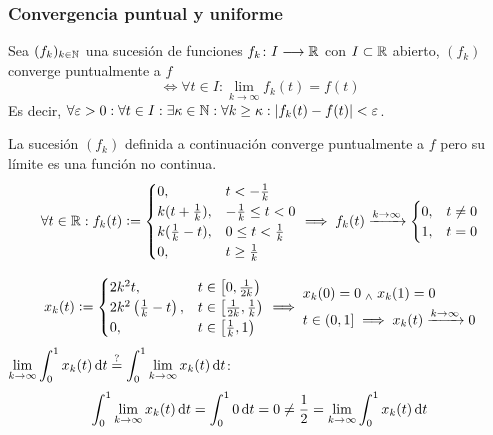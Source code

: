 \subsubsection{Convergencia puntual y uniforme}
\begin{defn}
	Sea $(f_k)_{k\in\mathbb{N}}$ una sucesión de funciones $f_k \colon I \longrightarrow \mathbb{R}$ con $I\subset \mathbb{R}$ abierto, $(f_k)$ converge puntualmente a $f$
	\[\iff \forall t\in I : \lim_{k\to\infty} f_k(t) = f(t)\]
	Es decir, $\forall \varepsilon > 0 : \forall t\in I : \exists \kappa \in \mathbb{N} : \forall k\geq \kappa : \left|f_k(t) - f(t)\right| < \varepsilon$.
\end{defn}

\begin{ejem}
	La sucesión $(f_k)$ definida a continuación converge puntualmente a $f$ pero su límite es una función no continua.
	\[\forall t \in\mathbb{R} : f_k(t) \vcentcolon= \begin{cases}
			0,                & t < -\frac{1}{k}        \\
			k(t+\frac{1}{k}), & -\frac{1}{k} \leq t < 0 \\
			k(\frac{1}{k}-t), & 0\leq t < \frac{1}{k}   \\
			0,                & t\geq \frac{1}{k}
		\end{cases} \implies f_k(t)\xrightarrow{k\to\infty}\begin{cases}
			0, & t\ne 0 \\
			1, & t=0
		\end{cases}\]
\end{ejem}
\begin{ejem}
	\[x_k(t) \vcentcolon= \begin{cases}
			2k^2t,                          & t\in\left[0, \frac{1}{2k}\right)           \\
			2k^2\left(\frac{1}{k}-t\right), & t\in\left[\frac{1}{2k}, \frac{1}{k}\right) \\
			0,                              & t\in\left[\frac{1}{k}, 1\right)            \\
		\end{cases}\implies \begin{aligned}
			 & x_k(0)=0 \; _{\wedge} \; x_k(1)=0                                  \\
			 & t\in (0,1] \implies x_k(t)  \xrightarrow{k\to\infty} 0
		\end{aligned}\]
	$\ds \lim_{k\to\infty} \int_{0}^1 x_k(t) \odif{t} \stackrel{?}{=} \int_{0}^1 \lim_{k\to\infty} x_k(t) \odif{t}$:
	\[ \int_{0}^1 \lim_{k\to\infty} x_k(t) \odif{t} = \int_{0}^{1} 0 \odif{t} = 0 \ne \frac{1}{2} = \lim_{k\to\infty}\int_{0}^{1} x_k(t) \odif{t}\]
\end{ejem}
